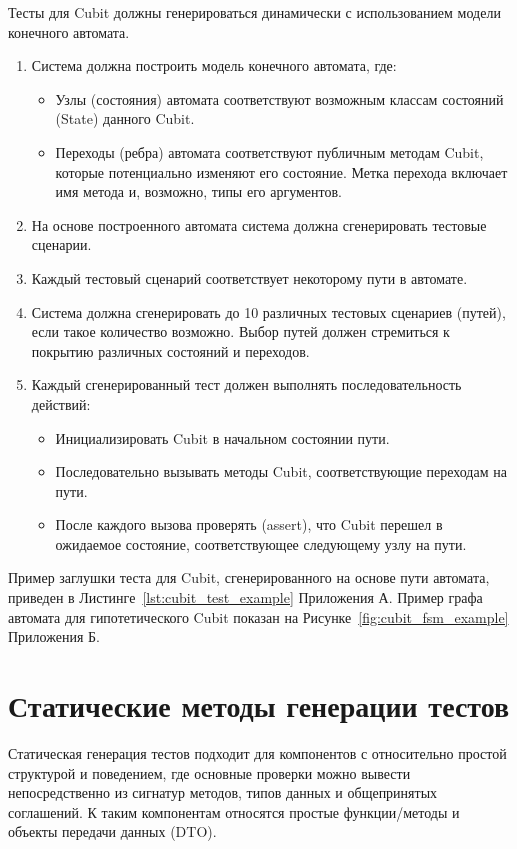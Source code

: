 \documentclass[14pt, russian]{scrartcl}
\begin{document}
Тесты для Cubit должны генерироваться динамически с использованием модели конечного автомата.
\begin{enumerate}
    \item Система должна построить модель конечного автомата, где:
        \begin{itemize}
            \item Узлы (состояния) автомата соответствуют возможным классам состояний (State) данного Cubit.
            \item Переходы (ребра) автомата соответствуют публичным методам Cubit, которые потенциально изменяют его состояние. Метка перехода включает имя метода и, возможно, типы его аргументов.
        \end{itemize}
    \item На основе построенного автомата система должна сгенерировать тестовые сценарии.
    \item Каждый тестовый сценарий соответствует некоторому пути в автомате.
    \item Система должна сгенерировать до 10 различных тестовых сценариев (путей), если такое количество возможно. Выбор путей должен стремиться к покрытию различных состояний и переходов.
    \item Каждый сгенерированный тест должен выполнять последовательность действий:
        \begin{itemize}
            \item Инициализировать Cubit в начальном состоянии пути.
            \item Последовательно вызывать методы Cubit, соответствующие переходам на пути.
            \item После каждого вызова проверять (assert), что Cubit перешел в ожидаемое состояние, соответствующее следующему узлу на пути.
        \end{itemize}
\end{enumerate}
Пример заглушки теста для Cubit, сгенерированного на основе пути автомата, приведен в Листинге~\ref{lst:cubit_test_example} Приложения А. Пример графа автомата для гипотетического Cubit показан на Рисунке~\ref{fig:cubit_fsm_example} Приложения Б.

\section{Статические методы генерации тестов}

Статическая генерация тестов подходит для компонентов с относительно простой структурой и поведением, где основные проверки можно вывести непосредственно из сигнатур методов, типов данных и общепринятых соглашений. К таким компонентам относятся простые функции/методы и объекты передачи данных (DTO).
\end{document}
